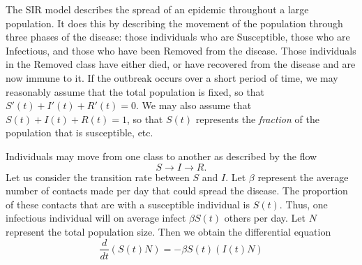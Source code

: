 % 
% 
% 
% 
% 
% 
% 
% 
The SIR model describes the spread of an epidemic throughout a large population.
It does this by describing the movement of the population through three phases of the disease: those individuals who are Susceptible, those who are Infectious, and those who have been Removed from the disease.
Those individuals in the Removed class have either died, or have recovered from the disease and are now immune to it.
If the outbreak occurs over a short period of time, we may reasonably assume that the total population is fixed, so that $S'(t) + I'(t) + R'(t) = 0$.
We may also assume that $S(t) + I(t) + R(t) = 1$, so that $S(t)$ represents the \textit{fraction} of the population that is susceptible, etc. 

Individuals may move from one class to another as described by the flow 
\[S \to I \to R.\]
Let us consider the transition rate between $S$ and $I $.
Let $\beta$ represent the average number of contacts made per day that could spread the disease.
The proportion of these contacts that are with a susceptible individual is $S(t)$.
Thus, one infectious individual will on average infect $\beta S(t)$ others per day.
Let $N$ represent the total population size.
Then we obtain the differential equation
\[\frac{d}{dt}(S(t) N) = -\beta S(t) (I(t) N)\]
 
